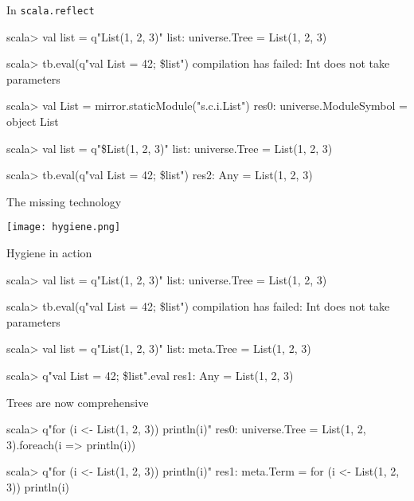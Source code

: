 \documentclass[svgnames,dvipsnames,hyperref={bookmarks=false},usepdftitle=false]{beamer}
\begin{document}
\begin{frame}[fragile]{In \texttt{scala.reflect}}
\begin{bad}
scala> val list = q"List(1, 2, 3)"
list: universe.Tree = List(1, 2, 3)

scala> tb.eval(q"val List = 42; \$list")
compilation has failed: Int does not take parameters
\end{bad}
\pause
\begin{good}
scala> val List = mirror.staticModule("s.c.i.List")
res0: universe.ModuleSymbol = object List

scala> val list = q"\$List(1, 2, 3)"
list: universe.Tree = List(1, 2, 3)

scala> tb.eval(q"val List = 42; \$list")
res2: Any = List(1, 2, 3)
\end{good}
\end{frame}

\begin{frame}[c, fragile]{The missing technology}
\vskip40pt
\begin{center}
\texttt{[image: hygiene.png]}
\end{center}
\end{frame}

\begin{frame}[fragile]{Hygiene in action}
\begin{beforeblock}
scala> val list = q"List(1, 2, 3)"
list: universe.Tree = List(1, 2, 3)

scala> tb.eval(q"val List = 42; \$list")
compilation has failed: Int does not take parameters
\end{beforeblock}
\begin{afterblock}
scala> val list = q"List(1, 2, 3)"
list: meta.Tree = List(1, 2, 3)

scala> q"val List = 42; \$list".eval
res1: Any = List(1, 2, 3)
\end{afterblock}
\end{frame}


\begin{frame}[fragile]{Trees are now comprehensive}
\begin{beforeblock}
scala> q"for (i <- List(1, 2, 3)) println(i)"
res0: universe.Tree = List(1, 2, 3).foreach(i => println(i))
\end{beforeblock}
\pause
\begin{afterblock}
scala> q"for (i <- List(1, 2, 3)) println(i)"
res1: meta.Term = for (i <- List(1, 2, 3)) println(i)
\end{afterblock}
\end{frame}
\end{document}
